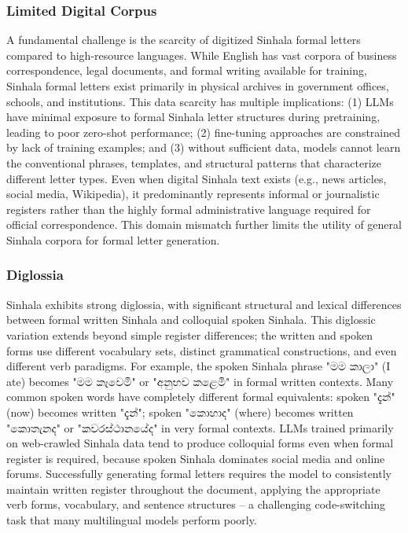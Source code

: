\documentclass[12pt]{uomthesis}
\newcommand{\si}[1]{{\sinhalafont #1}}
\begin{document}
\subsubsection{Limited Digital Corpus}
A fundamental challenge is the scarcity of digitized Sinhala formal letters compared to high-resource languages. While English has vast corpora of business correspondence, legal documents, and formal writing available for training, Sinhala formal letters exist primarily in physical archives in government offices, schools, and institutions. This data scarcity has multiple implications: (1) LLMs have minimal exposure to formal Sinhala letter structures during pretraining, leading to poor zero-shot performance; (2) fine-tuning approaches are constrained by lack of training examples; and (3) without sufficient data, models cannot learn the conventional phrases, templates, and structural patterns that characterize different letter types. Even when digital Sinhala text exists (e.g., news articles, social media, Wikipedia), it predominantly represents informal or journalistic registers rather than the highly formal administrative language required for official correspondence. This domain mismatch further limits the utility of general Sinhala corpora for formal letter generation.

\subsubsection{Diglossia}
Sinhala exhibits strong diglossia, with significant structural and lexical differences between formal written Sinhala and colloquial spoken Sinhala. This diglossic variation extends beyond simple register differences; the written and spoken forms use different vocabulary sets, distinct grammatical constructions, and even different verb paradigms. For example, the spoken Sinhala phrase "\si{මම කාලා}" (I ate) becomes "\si{මම කෑවෙමි}" or "\si{අනුභව කළෙමි}" in formal written contexts. Many common spoken words have completely different formal equivalents: spoken "\si{දැන්}" (now) becomes written "\si{දැන්}"; spoken "\si{කොහාද}" (where) becomes written "\si{කොතැනද}" or "\si{කවරස්ථානයේද}" in very formal contexts. LLMs trained primarily on web-crawled Sinhala data tend to produce colloquial forms even when formal register is required, because spoken Sinhala dominates social media and online forums. Successfully generating formal letters requires the model to consistently maintain written register throughout the document, applying the appropriate verb forms, vocabulary, and sentence structures – a challenging code-switching task that many multilingual models perform poorly.
\end{document}
